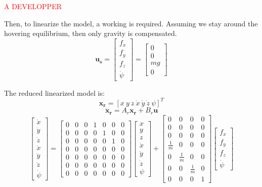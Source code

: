 \documentclass[a4paper, 12pt]{report}
\begin{document}
\textcolor{red}{A DEVELOPPER}

Then, to linearize the model, a working is required. Assuming we stay around the hovering equilibrium, then only gravity is compensated.
\[ \boldsymbol{u_s} = \begin{bmatrix} f_x \\ f_y \\ f_z \\ \dot \psi \end{bmatrix} = \begin{bmatrix}  0\\ 0\\ mg \\ 0\end{bmatrix} \]

The reduced linearized model is:
 \[\boldsymbol{x_r} =  [x \ y \ z \ \dot x \ \dot y \ \dot z \ \psi]^T \]
\[\boldsymbol{\dot x_r} =  A_r \boldsymbol{x_r} + B_r \boldsymbol{u} \]
\[\begin{bmatrix}\dot x \\ \dot y \\ \dot z \\ \ddot x \\ \ddot y \\ \ddot z \\ \dot \psi\end{bmatrix}  = 
\begin{bmatrix}  0 & 0 & 0 & 1 & 0 & 0 & 0 \\ 0 & 0 & 0 & 0 & 1 & 0 & 0 \\ 0 & 0 & 0 & 0 & 0 & 1 & 0 \\ 0 & 0 & 0 & 0 & 0 & 0 & 0 \\ 0 & 0 & 0 & 0 & 0 & 0 & 0 \\ 0 & 0 & 0 & 0 & 0 & 0 & 0 \\ 0 & 0 & 0 & 0 & 0 & 0 & 0 \end{bmatrix} 
\begin{bmatrix} x \\ y \\ z \\ \dot x \\ \dot y \\ \dot z \\ \psi \end{bmatrix}  + \begin{bmatrix}  0 & 0 & 0 & 0 \\ 0 & 0 & 0 & 0 \\ 0 & 0 & 0 & 0 \\ \frac{1}{m} & 0 & 0 & 0 \\ 0 & \frac{1}{m} & 0 & 0 \\ 0 & 0 & \frac{1}{m} & 0 \\ 0 & 0 & 0 & 1 \end{bmatrix} \begin{bmatrix} f_x \\ f_y \\ f_z \\ \dot \psi \end{bmatrix} \]
\end{document}

